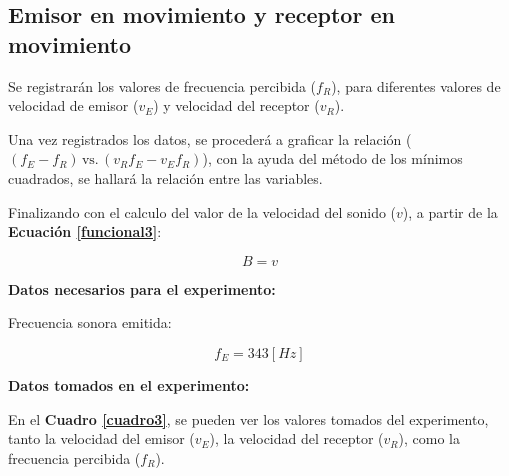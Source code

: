 \documentclass[letter,11pt]{article}
\begin{document}
\subsection{Emisor en movimiento y receptor en movimiento}

Se registrarán los valores de frecuencia percibida ($f_R$), para diferentes
valores de velocidad de emisor ($v_E$) y velocidad del receptor ($v_R$).

Una vez registrados los datos, se procederá a graficar la relación 
($(f_E-f_R)\,\text{vs.}\,(v_R f_E - v_E f_R)$), con la ayuda del método de los
mínimos cuadrados, se hallará la relación entre las variables.

Finalizando con el calculo del valor de la velocidad del sonido ($v$), a partir
de la \textbf{Ecuación \ref{funcional3}}:

\begin{equation}
    B = v
\label{v3}
\end{equation}
\vspace{0.10cm}

\textbf{Datos necesarios para el experimento:}

Frecuencia sonora emitida:

\begin{equation*}
    f_E = 343 [Hz]
\end{equation*}
\vspace{0.10cm}

\textbf{Datos tomados en el experimento:}

En el \textbf{Cuadro \ref{cuadro3}}, se pueden ver los valores tomados del
experimento, tanto la velocidad del emisor ($v_E$), la velocidad del receptor
($v_R$), como la frecuencia percibida ($f_R$).
\end{document}
